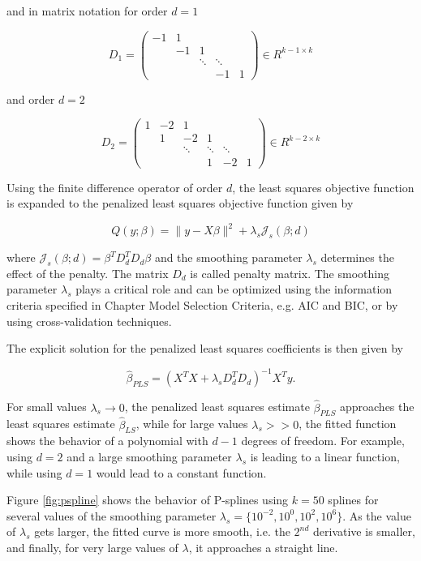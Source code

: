 \documentclass[10pt,a4paper]{article}
\begin{document}
	and in matrix notation for order $d=1$
	
	$$D_1 = \begin{pmatrix} 
					-1& 1&       &        &   \\  
					  &-1& 1     &        &   \\  
					  &  &\ddots & \ddots &   \\ 
					  &  &       & -1     & 1 
			\end{pmatrix} \in R^{k-1\times k}$$
	
	and order $d=2$
	
	$$D_2 = \begin{pmatrix} 
				1& -2& 1& &    \\  
				 & 1 & -2 & 1& \\ 
				 &  & \ddots & \ddots  & \ddots \\ 
				 & & & 1 & -2 & 1 
			\end{pmatrix} \in R^{k-2\times k}$$
	
	Using the finite difference operator of order $d$, the least squares objective function is expanded to the penalized least squares objective function given by
	
	$$Q(y; \beta) = \lVert y - X\beta \rVert^2 + \lambda_s \mathcal J_s(\beta; d)$$
	
	where $\mathcal J_s(\beta; d) = \beta^T D_d^T D_d \beta$ and the smoothing parameter $\lambda_s$ determines the effect of the penalty. The matrix $D_d$ is called penalty matrix. The smoothing parameter $\lambda_s$ plays a critical role and can be optimized using the information criteria specified in Chapter Model Selection Criteria, e.g. AIC and BIC, or by using cross-validation techniques. \cite{fahrmeir2013regression}
	
	The explicit solution for the penalized least squares coefficients is then given by
	
	$$\hat \beta_{PLS} = (X^TX + \lambda_s D_d^TD_d)^{-1} X^T y.$$
	
	For small values $\lambda_s \rightarrow 0$, the penalized least squares estimate $\hat \beta_{PLS}$ approaches the least squares estimate $\hat \beta_{LS}$, while for large values $\lambda_s >> 0$, the fitted function shows the behavior of a polynomial with $d-1$ degrees of freedom. For example, using $d=2$ and a large smoothing parameter $\lambda_s$ is leading to a linear function, while using $d=1$ would lead to a constant function. \cite{fahrmeir2013regression}
	
	Figure \ref{fig:pspline} shows the behavior of P-splines using $k=50$ splines for several values of the smoothing parameter $\lambda_s = \{10^{-2}, 10^{0},10^{2},10^{6}\}.$  As the value of $\lambda_s$ gets larger, the fitted curve is more smooth, i.e. the $2^{nd}$ derivative is smaller, and finally, for very large values of $\lambda$, it approaches a straight line.
	
\end{document}
